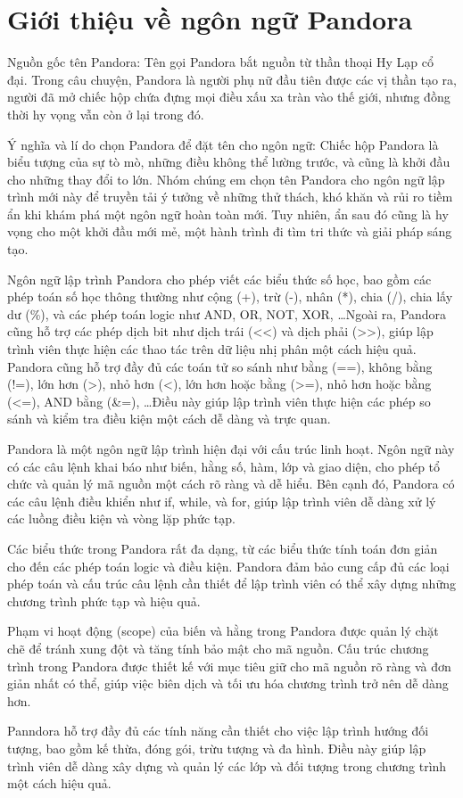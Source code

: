 \section{Giới thiệu về ngôn ngữ Pandora}
Nguồn gốc tên Pandora: 
    Tên gọi Pandora bắt nguồn từ thần thoại 
    Hy Lạp cổ đại. Trong câu chuyện, Pandora là người phụ nữ đầu tiên được 
    các vị thần tạo ra, người đã mở chiếc hộp chứa đựng mọi điều xấu xa tràn 
    vào thế giới, nhưng đồng thời hy vọng vẫn còn ở lại trong đó.

Ý nghĩa và lí do chọn Pandora để đặt tên cho ngôn ngữ: 
    Chiếc hộp Pandora là biểu tượng của sự tò mò, những điều không thể 
    lường trước, và cũng là khởi đầu cho những thay đổi to lớn. Nhóm chúng 
    em chọn tên Pandora cho ngôn ngữ lập trình mới này để truyền tải ý 
    tưởng về những thử thách, khó khăn và rủi ro tiềm ẩn khi khám phá một 
    ngôn ngữ hoàn toàn mới. Tuy nhiên, ẩn sau đó cũng là hy vọng cho một 
    khởi đầu mới mẻ, một hành trình đi tìm tri thức và giải pháp sáng tạo.

Ngôn ngữ lập trình Pandora cho phép viết các biểu thức số học, bao gồm các phép toán số học thông thường như cộng (+), trừ (-), nhân (*), chia (/), chia lấy dư (\%), và các phép toán logic như AND, OR, NOT, XOR, \dots Ngoài ra, Pandora cũng hỗ trợ các phép dịch bit như dịch trái ({<}{<}) và dịch phải ({>}{>}), giúp lập trình viên thực hiện các thao tác trên dữ liệu nhị phân một cách hiệu quả. Pandora cũng hỗ trợ đầy đủ các toán tử so sánh như bằng (==), không bằng (!=), lớn hơn (>), nhỏ hơn (<), lớn hơn hoặc bằng (>=), nhỏ hơn hoặc bằng (<=), AND bằng (\&=), \dots Điều này giúp lập trình viên thực hiện các phép so sánh và kiểm tra điều kiện một cách dễ dàng và trực quan.

Pandora là một ngôn ngữ lập trình hiện đại với cấu trúc linh hoạt. Ngôn ngữ này có các câu lệnh khai báo như biến, hằng số, hàm, lớp và giao diện, cho phép tổ chức và quản lý mã nguồn một cách rõ ràng và dễ hiểu. Bên cạnh đó, Pandora có các câu lệnh điều khiển như if, while, và for, giúp lập trình viên dễ dàng xử lý các luồng điều kiện và vòng lặp phức tạp.
    
Các biểu thức trong Pandora rất đa dạng, từ các biểu thức tính toán đơn giản cho đến các phép toán logic và điều kiện. Pandora đảm bảo cung cấp đủ các loại phép toán và cấu trúc câu lệnh cần thiết để lập trình viên có thể xây dựng những chương trình phức tạp và hiệu quả.

Phạm vi hoạt động (scope) của biến và hằng trong Pandora được quản lý chặt chẽ để tránh xung đột và tăng tính bảo mật cho mã nguồn. Cấu trúc chương trình trong Pandora được thiết kế với mục tiêu giữ cho mã nguồn rõ ràng và đơn giản nhất có thể, giúp việc biên dịch và tối ưu hóa chương trình trở nên dễ dàng hơn.

Panndora hỗ trợ đầy đủ các tính năng cần thiết cho việc lập trình hướng đối tượng, bao gồm kế thừa, đóng gói, trừu tượng và đa hình. Điều này giúp lập trình viên dễ dàng xây dựng và quản lý các lớp và đối tượng trong chương trình một cách hiệu quả.
